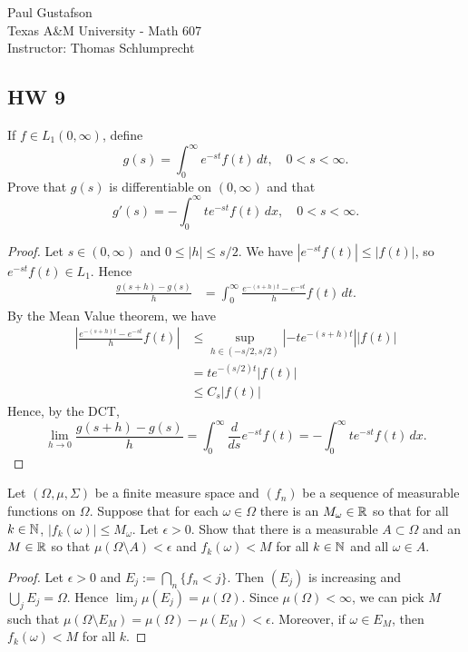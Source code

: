 \documentclass{article}
\begin{document}
\noindent Paul Gustafson\\
\noindent Texas A\&M University - Math 607\\ 
\noindent Instructor: Thomas Schlumprecht

\subsection*{HW 9}
 If $f \in L_1(0,\infty)$, define
$$g(s) = \int_0^\infty e^{-st}f(t) \,dt, \quad 0 < s < \infty.$$
Prove that $g(s)$ is differentiable on $(0,\infty)$ and that
$$g'(s) = - \int_0^\infty t e^{-st} f(t) \, dx, \quad 0 < s < \infty.$$
\begin{proof}
Let $s \in (0,\infty)$ and $0 \le |h| \le s/2$. We have $|e^{-st}f(t)| \le |f(t)|$, so $e^{-st}f(t) \in L_1$. Hence 
\begin{align*}
\frac { g(s + h) - g(s)} h & = \int_0^\infty \frac {e^{-(s+h)t} - e^{-st}} h  f(t) \,dt.
\end{align*}
By the Mean Value theorem, we have  
\begin{align*}
\left|\frac {e^{-(s+h)t} - e^{-st}} h f(t)\right| & \le \sup_{h \in (-s/2,s/2)} |-t e^{-(s+h)t}| \left|f(t)\right|
\\ & = t e^{-(s/2)t} |f(t)|
\\ &  \le C_s |f(t)|
\end{align*}
Hence, by the DCT,
$$\lim_{h \to 0} \frac { g(s + h) - g(s)} h = \int_0^\infty \frac d {ds} e^{-st} f(t) = - \int_0^\infty t e^{-st} f(t) \, dx. $$
\end{proof}

 Let $(\Omega, \mu, \Sigma)$ be a finite measure space and $(f_n)$ be a sequence of measurable functions on $\Omega$. Suppose that for each $\omega \in \Omega$ there is an $M_\omega \in \mathbb{R}$ so that for all $k \in \mathbb{N}$, $|f_k(\omega)| \le M_\omega$. Let $\epsilon > 0$. Show that there is a measurable $A \subset \Omega$ and an $M \in \mathbb{R}$ so that $\mu(\Omega \setminus A) < \epsilon$ and $f_k(\omega) < M$ for all $k \in \mathbb{N}$ and all $\omega \in A$.
\begin{proof}
Let $\epsilon > 0$ and $E_j := \bigcap_n \{f_n < j \}$.  Then $(E_j)$ is increasing and $\bigcup_j E_j = \Omega$. Hence $\lim_j \mu(E_j) = \mu(\Omega)$.  Since $\mu(\Omega) < \infty$, we can pick $M$ such that $\mu(\Omega \setminus E_M) = \mu(\Omega) - \mu(E_M) < \epsilon$. Moreover, if $\omega \in E_M$, then $f_k(\omega) < M$ for all $k$.
\end{proof}
\end{document}
